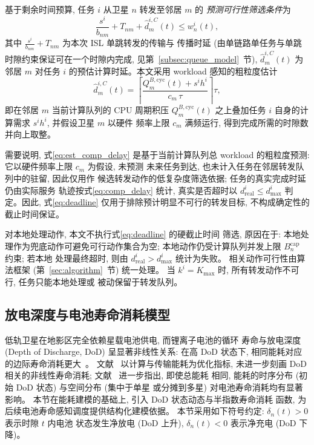 \documentclass[a4paper,11pt]{article}
\begin{document}
基于剩余时间预算, 任务 $i$ 从卫星 $n$ 转发至邻居 $m$ 的
\emph{预测可行性筛选条件}为
\begin{equation}
    \frac{s^i}{b_{nm}} + T_{nm} + \hat{d}^{i,C}_m(t)
    \le w^i_n(t),
    \label{eq:deadline}
\end{equation}
其中 $\frac{s^i}{b_{nm}} + T_{nm}$ 为本次 ISL 单跳转发的传输与
传播时延 (由单链路单任务与单跳时隙约束保证可在一个时隙内完成,
见第~\ref{subsec:queue_model}~节), $\hat{d}^{i,C}_m(t)$ 为邻居 $m$
对任务 $i$ 的预估计算时延。本文采用 workload 感知的粗粒度估计
\begin{equation}
    \hat{d}^{i,C}_m(t) = \left\lceil
    \frac{Q^{B,\mathrm{cyc}}_m(t) + s^i h^i}{c_m\, \tau}
    \right\rceil \tau,
    \label{eq:est_comp_delay}
\end{equation}
即在邻居 $m$ 当前计算队列的 CPU 周期积压 $Q^{B,\mathrm{cyc}}_m(t)$
之上叠加任务 $i$ 自身的计算需求 $s^i h^i$, 并假设卫星 $m$ 以硬件
频率上限 $c_m$ 满频运行, 得到完成所需的时隙数并向上取整。

需要说明, 式\eqref{eq:est_comp_delay} 是基于当前计算队列总
workload 的粗粒度预测: 它以硬件频率上限 $c_m$ 为假设, 未预测
未来任务到达, 也未计入任务在邻居转发队列中的驻留, 因此仅用作
候选转发动作的低复杂度筛选依据; 任务的真实完成时延仍由实际服务
轨迹按式\eqref{eq:comp_delay} 统计, 真实是否超时以
$d^i_{\mathrm{real}} \le d^i_{\max}$ 判定。因此, 式\eqref{eq:deadline}
仅用于排除预计明显不可行的转发目标, 不构成确定性的截止时间保证。

对本地处理动作, 本文不执行式\eqref{eq:deadline} 的硬截止时间
筛选, 原因在于: 本地处理作为兜底动作可避免可行动作集合为空;
本地动作仍受计算队列并发上限 $B^{\mathrm{cap}}_n$ 约束; 若本地
处理最终超时, 则由 $d^i_{\mathrm{real}} > d^i_{\max}$ 统计为失败。
相关动作可行性由算法框架 (第~\ref{sec:algorithm}~节) 统一处理。
当 $k^i = K_{\max}$ 时, 所有转发动作不可行, 任务只能本地处理或
被动保留于转发队列。
\subsection{放电深度与电池寿命消耗模型}
\label{subsec:battery}

低轨卫星在地影区完全依赖星载电池供电, 而锂离子电池的循环
寿命与放电深度 (Depth of Discharge, DoD) 呈显著非线性关系:
在高 DoD 状态下, 相同能耗对应的边际寿命消耗更大~\cite{yang2016energy,li2024battery,chen2025tasri}。
文献~\cite{zhang2024mhspo} 以计算与传输能耗为优化指标, 
未进一步刻画 DoD 相关的非线性寿命消耗;
文献~\cite{li2024battery,chen2025tasri} 进一步指出, 即使总能耗
相同, 能耗的时序分布 (初始 DoD 状态) 与空间分布 (集中于单星
或分摊到多星) 对电池寿命消耗均有显著影响。
本节在能耗建模的基础上, 引入 DoD 状态动态与半指数寿命消耗
函数, 为后续电池寿命感知调度提供结构化建模依据。
本节采用如下符号约定: $\delta_n(t) > 0$ 表示时隙 $t$ 内电池
状态发生净放电 (DoD 上升), $\delta_n(t) < 0$ 表示净充电
(DoD 下降)。
\end{document}
